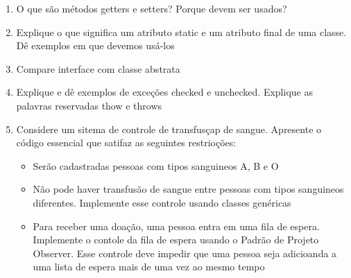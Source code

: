 \documentclass{article}
\begin{document}
\begin{enumerate}
	\item O que são métodos getters e setters? Porque devem ser usados?
	\item Explique o que significa um atributo static e um atributo final de
	      uma classe. Dê exemplos em que devemos usá-los
	\item Compare interface com classe abstrata
	\item Explique e dê exemplos de exceções checked e unchecked. Explique as
	      palavras reservadas thow e throws
	\item Considere um sitema de controle de transfusçap de sangue. Apresente o
	      código essencial que satifaz as seguintes restrioções:

	      \begin{itemize}
		      \item Serão cadastradas pessoas com tipos sanguineos A, B e O
		      \item Não pode haver transfusão de sangue entre pessoas com tipos
		            sanguineos diferentes. Implemente esse controle usando classes
		            genéricas
		      \item Para receber uma doação, uma pessoa entra em uma fila de
		            espera. Implemente o contole da fila de espera usando o
		            Padrão de Projeto Observer. Esse controle deve impedir que
		            uma pessoa seja adicioanda a uma lista de espera mais de
		            uma vez ao mesmo tempo
	      \end{itemize}
\end{enumerate}
\end{document}
